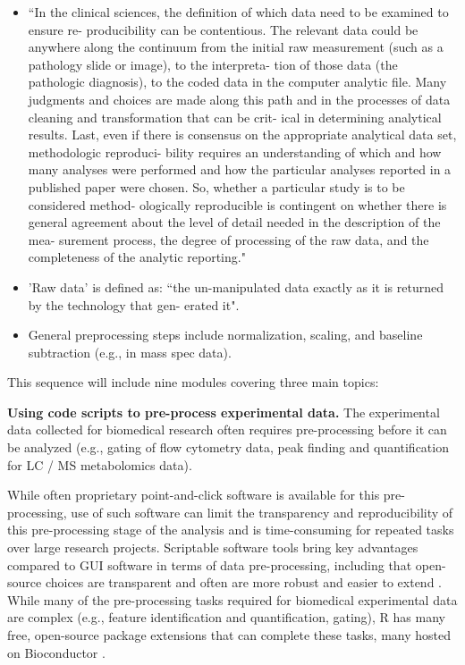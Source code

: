 \documentclass[pdftex,english,11pt,parskip=half]{scrartcl}
\begin{document}
\begin{itemize}
\item ``In the clinical sciences, the definition of which data need to be examined to ensure re- producibility can be contentious. The relevant data could be anywhere along the continuum from the initial raw measurement (such as a pathology slide or image), to the interpreta- tion of those data (the pathologic diagnosis), to the coded data in the computer analytic file. Many judgments and choices are made along this path and in the processes of data cleaning and transformation that can be crit- ical in determining analytical results. Last, even if there is consensus on the appropriate analytical data set, methodologic reproduci- bility requires an understanding of which and how many analyses were performed and how the particular analyses reported in a published paper were chosen. So, whether a particular study is to be considered method- ologically reproducible is contingent on whether there is general agreement about the level of detail needed in the description of the mea- surement process, the degree of processing of the raw data, and the completeness of the analytic reporting." \cite{goodman2016does}
\item 'Raw data' is defined as: ``the un-manipulated data exactly as it is returned by the technology that gen- erated it". \cite{shade2015computing}
\item General preprocessing steps include normalization, scaling, and baseline subtraction (e.g., in mass spec data).
\end{itemize}

This sequence will include nine modules
covering three main topics: 

\textbf{Using code scripts to pre-process experimental data.} The experimental data collected for biomedical research often requires 
pre-processing before it can be analyzed (e.g., gating of flow cytometry data, 
peak finding and quantification for LC / MS metabolomics data). 

While 
often proprietary point-and-click software is available for this pre-processing,
use of such software can limit the transparency and reproducibility of this 
pre-processing stage of the analysis and is 
time-consuming for repeated tasks over large research projects. Scriptable
software tools bring key advantages compared to GUI software in terms of data
pre-processing, including that open-source choices are transparent and often are more robust and easier to extend \cite{cetinkaya2017infrastructure, huber2015orchestrating,
preeyanon2014reproducible, piccolo2016tools, baumer2017lessons}. While many of the pre-processing tasks required for biomedical experimental data are complex (e.g., feature identification and quantification, gating), R has many free, open-source package extensions that can complete these tasks, many hosted on Bioconductor \cite{huber2015orchestrating}.
\end{document}

